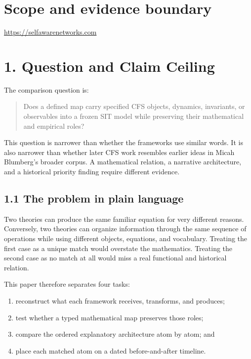 \documentclass[
  american,
  11pt,
  letterpaper,
]{article}
\providecommand{\tightlist}{%
  \setlength{\itemsep}{0pt}\setlength{\parskip}{0pt}}
\begin{document}
\section{Scope and evidence boundary}\label{scope-and-evidence-boundary}

\url{https://selfawarenetworks.com}

\section{1. Question and Claim Ceiling}\label{question-and-claim-ceiling}

The comparison question is:

\begin{quote}
Does a defined map carry specified CFS objects, dynamics, invariants, or observables into a frozen SIT model while preserving their mathematical and empirical roles?
\end{quote}

This question is narrower than whether the frameworks use similar words. It is also narrower than whether later CFS work resembles earlier ideas in Micah Blumberg's broader corpus. A mathematical relation, a narrative architecture, and a historical priority finding require different evidence.

\subsection{1.1 The problem in plain language}\label{the-problem-in-plain-language}

Two theories can produce the same familiar equation for very different reasons. Conversely, two theories can organize information through the same sequence of operations while using different objects, equations, and vocabulary. Treating the first case as a unique match would overstate the mathematics. Treating the second case as no match at all would miss a real functional and historical relation.

This paper therefore separates four tasks:

\begin{enumerate}
\def\labelenumi{\arabic{enumi}.}
\tightlist
\item
  reconstruct what each framework receives, transforms, and produces;
\item
  test whether a typed mathematical map preserves those roles;
\item
  compare the ordered explanatory architecture atom by atom; and
\item
  place each matched atom on a dated before-and-after timeline.
\end{enumerate}
\end{document}
